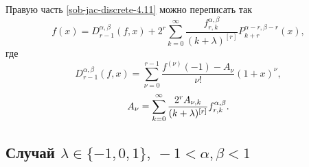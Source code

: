  Правую часть \eqref{sob-jac-discrete-4.11} можно переписать так
\begin{equation}\label{sob-jac-discrete-4.12}
f(x)=D^{\alpha,\beta}_{r-1}(f,x)+2^r\sum_{k=0}^\infty\frac{f^{\alpha,\beta}_{r,k}}{(k+\lambda)^{[r]}}P_{k+r}^{\alpha-r,\beta-r}(x),
\end{equation}
где
\begin{equation}\label{sob-jac-discrete-4.13}
D^{\alpha,\beta}_{r-1}(f,x)=\sum^{r-1}_{\nu=0}\frac{f^{(\nu)}(-1)-A_\nu}{\nu!}(1+x)^\nu,
\end{equation}
\begin{equation}\label{sob-jac-discrete-4.14}
A_\nu=\sum_{k=0}^\infty {2^rA_{\nu,k}\over(k+\lambda)^{[r]}}f_{r,k}^{\alpha,\beta}.
\end{equation}

\subsection{Случай $\lambda\in\{-1,0,1\}, \ -1<\alpha, \beta<1 $}

